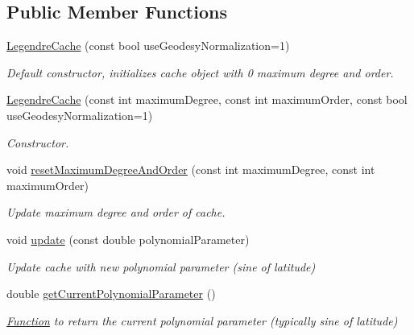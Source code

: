 \subsection*{Public Member Functions}
\begin{DoxyCompactItemize}
\item 
\hyperlink{classtudat_1_1basic__mathematics_1_1LegendreCache_ace17d10db3c668eaea0a28fd4633bc7c}{Legendre\+Cache} (const bool use\+Geodesy\+Normalization=1)
\begin{DoxyCompactList}\small\item\em Default constructor, initializes cache object with 0 maximum degree and order. \end{DoxyCompactList}\item 
\hyperlink{classtudat_1_1basic__mathematics_1_1LegendreCache_a69fc5726b1c8e5f45e712bf4791bd394}{Legendre\+Cache} (const int maximum\+Degree, const int maximum\+Order, const bool use\+Geodesy\+Normalization=1)
\begin{DoxyCompactList}\small\item\em Constructor. \end{DoxyCompactList}\item 
void \hyperlink{classtudat_1_1basic__mathematics_1_1LegendreCache_aabb909b51bb51bc99e7c76f26b8b57ca}{reset\+Maximum\+Degree\+And\+Order} (const int maximum\+Degree, const int maximum\+Order)
\begin{DoxyCompactList}\small\item\em Update maximum degree and order of cache. \end{DoxyCompactList}\item 
void \hyperlink{classtudat_1_1basic__mathematics_1_1LegendreCache_ad3d0056011b0b9b312ff38b85ff43e60}{update} (const double polynomial\+Parameter)
\begin{DoxyCompactList}\small\item\em Update cache with new polynomial parameter (sine of latitude) \end{DoxyCompactList}\item 
double \hyperlink{classtudat_1_1basic__mathematics_1_1LegendreCache_ac9ce6352fca3d5b62d46f5cb670806ce}{get\+Current\+Polynomial\+Parameter} ()
\begin{DoxyCompactList}\small\item\em \hyperlink{classtudat_1_1basic__mathematics_1_1Function}{Function} to return the current polynomial parameter (typically sine of latitude) \end{DoxyCompactList}\item 

\end{DoxyCompactItemize}
